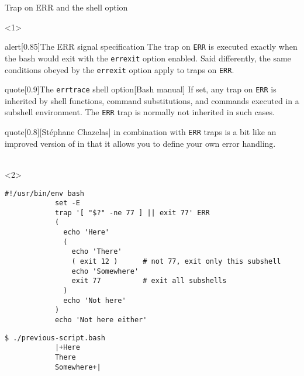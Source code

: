 \begin{frame}[fragile]{Trap on ERR and the  shell option}
    \vspace{-1mm}
    \begin{onlyenv}<1>
        \begin{varblock}{alert}[0.85\textwidth]{The ERR signal specification}
            The trap on \texttt{ERR} is executed exactly when the bash would exit with the \texttt{errexit} option enabled.
            Said differently, the same conditions obeyed by the \texttt{errexit} option apply to traps on \texttt{ERR}.
        \end{varblock}
        \begin{varblock}{quote}[0.9\textwidth]{The \;\texttt{errtrace}\; shell option}[Bash manual]
            If set, any trap on \texttt{ERR} is inherited by shell functions, command substitutions, and commands executed in a subshell environment.
            The \texttt{ERR} trap is normally not inherited in such cases.
        \end{varblock}
        \begin{varblock}{quote}[0.8\textwidth]{}[St\'ephane Chazelas]
             in combination with \texttt{ERR} traps is a bit like an improved version of  in that it allows you to define your own error handling.\\[-0.5em] ~
        \end{varblock}
    \end{onlyenv}
    \begin{onlyenv}<2>
        \begin{lstlisting}[style=myBash, aboveskip=2mm]
            #!/usr/bin/env bash
            set -E
            trap '[ "$?" -ne 77 ] || exit 77' ERR
            (
              echo 'Here'
              (
                echo 'There'
                ( exit 12 )      # not 77, exit only this subshell
                echo 'Somewhere'
                exit 77          # exit all subshells
              )
              echo 'Not here'
            )
            echo 'Not here either'
        \end{lstlisting}
        \begin{lstlisting}[style=myBash, aboveskip=2mm, numbers=none]
            $ ./previous-script.bash
            |+Here
            There
            Somewhere+|
        \end{lstlisting}
    \end{onlyenv}
\end{frame}
